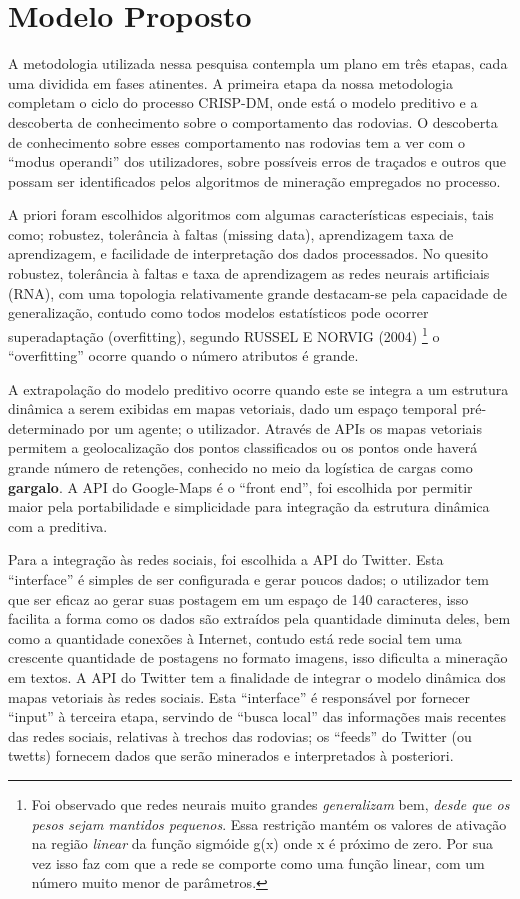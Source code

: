 \section{Modelo Proposto}

A metodologia utilizada nessa pesquisa contempla um plano em três etapas, cada uma dividida em fases atinentes.
A primeira etapa da nossa metodologia completam o ciclo do processo CRISP-DM, onde está o modelo preditivo e 
a descoberta de conhecimento sobre o comportamento das rodovias. O descoberta de conhecimento sobre esses comportamento 
nas rodovias tem a ver com o ``modus operandi'' dos utilizadores, sobre possíveis erros de traçados e outros que possam
ser identificados pelos algoritmos de mineração empregados no processo.

A priori foram escolhidos algoritmos com algumas características especiais, tais como; robustez, tolerância à faltas (missing data),
aprendizagem taxa de aprendizagem, e facilidade de interpretação dos dados processados. 
No quesito robustez, tolerância à faltas e taxa de aprendizagem as redes neurais artificiais (RNA), com uma 
topologia relativamente grande destacam-se pela capacidade de generalização, contudo como todos modelos estatísticos pode ocorrer 
superadaptação (overfitting), segundo RUSSEL E NORVIG (2004)  \footnote{Foi observado que redes neurais muito grandes \textit{generalizam} bem, 
\textit{desde que os pesos sejam mantidos pequenos}. Essa restrição mantém os valores de ativação na região 
\textit{linear} da função sigmóide g(x) onde x é próximo de zero. Por sua vez isso faz com que a rede se comporte 
como uma função linear, com um número muito menor de parâmetros.} o ``overfitting''
 ocorre quando o número atributos é grande.

A extrapolação do modelo preditivo ocorre quando este se integra a um estrutura dinâmica a serem exibidas em mapas vetoriais, 
dado um espaço temporal pré-determinado por um agente; o utilizador. 
Através de APIs os mapas vetoriais permitem a geolocalização dos pontos classificados ou os pontos onde haverá grande número de 
retenções, conhecido no meio da logística de cargas como \textbf{gargalo}.
A API do Google-Maps é o ``front end'', foi escolhida por permitir maior pela portabilidade e simplicidade para integração da estrutura
dinâmica com a preditiva.

Para a integração às redes sociais, foi escolhida a API do Twitter. Esta ``interface'' é simples de ser configurada e gerar poucos dados; 
o utilizador tem que ser eficaz ao gerar suas postagem em um espaço de 140 caracteres, isso facilita a forma como os dados são
extraídos pela quantidade diminuta deles, bem como a quantidade conexões à Internet, contudo está rede social tem uma crescente quantidade
de postagens no formato imagens, isso dificulta a mineração em textos.
A API do Twitter tem a finalidade de integrar o modelo dinâmica dos mapas vetoriais às redes sociais. 
Esta ``interface'' é responsável por fornecer ``input'' à terceira etapa, servindo de ``busca local'' das informações mais recentes das 
redes sociais, relativas à trechos das rodovias; os ``feeds'' do Twitter (ou twetts) fornecem dados que serão minerados e interpretados à posteriori.

